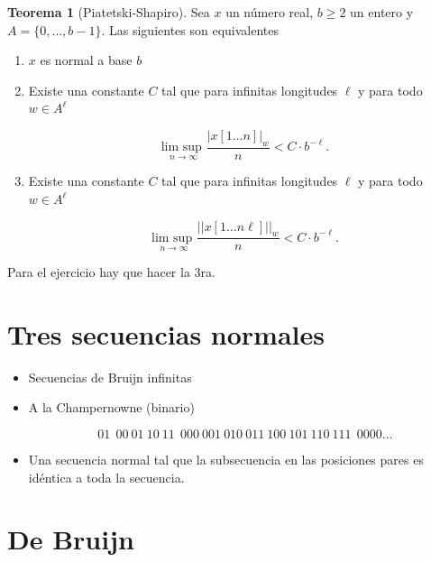 \documentclass{report}
\theoremstyle{definition} %
\newtheorem{theorem}{Teorema}
\begin{document}
\begin{theorem}[Piatetski-Shapiro]\label{teo:piatetski-shapiro}
    Sea $x$ un número real, $b \geq 2$ un entero y $A = \{0, \dots, b - 1\}$.
    Las siguientes son equivalentes
    \begin{enumerate}
        \item $x$ es normal a base $b$
        \item Existe una constante $C$ tal que para infinitas longitudes $\ell$ y
        para todo $w \in A^\ell$

        $$
            \underset{n \to \infty}{\text{lim sup }}
            \frac{|x[1\dots n]|_w}{n} < C \cdot b^{-\ell}.
        $$
        \item Existe una constante $C$ tal que para infinitas longitudes $\ell$ y
        para todo $w \in A^\ell$

        $$
            \underset{n \to \infty}{\text{lim sup }}
            \frac{||x[1\dots n\ell]||_w}{n} < C \cdot b^{-\ell}.
        $$ 
    \end{enumerate}
\end{theorem}

Para el ejercicio hay que hacer la 3ra.

\section{Tres secuencias normales}

\begin{itemize}
    \item Secuencias de Bruijn infinitas
    \item A la Champernowne (binario)
    
    $$01\ \ 00\ 01\ 10\ 11\ \ 000\ 001\ 010\ 011\ 100\ 101\ 110\ 111\ \ 0000 \dots$$

    \item Una secuencia normal tal que la subsecuencia en las posiciones pares
    es idéntica a toda la secuencia.
\end{itemize}

\section{De Bruijn}
\end{document}

